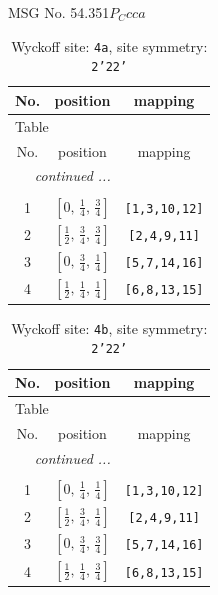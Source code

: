 \documentclass[fleqn,8pt]{jsarticle}
\begin{document}
\setcounter{MaxMatrixCols}{32}

\renewcommand{\tablename}{Table~}
\renewcommand{\figurename}{Figure~}
\begin{center}
\LARGE
MSG No. 54.351\quad$P_{C}cca$
\end{center}
\renewcommand{\arraystretch}{1.2}
\begin{longtable}{ccc}
\caption{Wyckoff site: {\tt 4a}, site symmetry: {\tt 2'22'}}
 \\
 \hline \hline
No. & position & mapping \\ \hline \endfirsthead

\multicolumn{2}{l}{\tablename\ \thetable{}} \\
 \hline \hline
No. & position & mapping \\ \hline \endhead

 \hline \hline
\multicolumn{2}{r}{\footnotesize\it continued ...} \\ \endfoot

 \hline \hline
\multicolumn{2}{r}{} \\ \endlastfoot

1 & $\left[ 0,\, \frac{1}{4},\, \frac{3}{4} \right]$ & {\tt [1,3,10,12]} \\ \hline
2 & $\left[ \frac{1}{2},\, \frac{3}{4},\, \frac{3}{4} \right]$ & {\tt [2,4,9,11]} \\ \hline
3 & $\left[ 0,\, \frac{3}{4},\, \frac{1}{4} \right]$ & {\tt [5,7,14,16]} \\ \hline
4 & $\left[ \frac{1}{2},\, \frac{1}{4},\, \frac{1}{4} \right]$ & {\tt [6,8,13,15]} \\
\end{longtable}
\renewcommand{\arraystretch}{1.2}
\begin{longtable}{ccc}
\caption{Wyckoff site: {\tt 4b}, site symmetry: {\tt 2'22'}}
 \\
 \hline \hline
No. & position & mapping \\ \hline \endfirsthead

\multicolumn{2}{l}{\tablename\ \thetable{}} \\
 \hline \hline
No. & position & mapping \\ \hline \endhead

 \hline \hline
\multicolumn{2}{r}{\footnotesize\it continued ...} \\ \endfoot

 \hline \hline
\multicolumn{2}{r}{} \\ \endlastfoot

1 & $\left[ 0,\, \frac{1}{4},\, \frac{1}{4} \right]$ & {\tt [1,3,10,12]} \\ \hline
2 & $\left[ \frac{1}{2},\, \frac{3}{4},\, \frac{1}{4} \right]$ & {\tt [2,4,9,11]} \\ \hline
3 & $\left[ 0,\, \frac{3}{4},\, \frac{3}{4} \right]$ & {\tt [5,7,14,16]} \\ \hline
4 & $\left[ \frac{1}{2},\, \frac{1}{4},\, \frac{3}{4} \right]$ & {\tt [6,8,13,15]} \\
\end{longtable}
\end{document}
